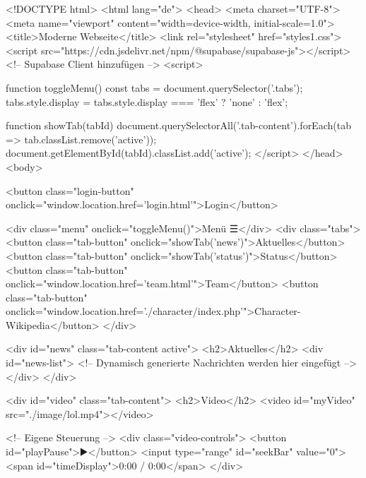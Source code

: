 <!DOCTYPE html>
<html lang="de">
<head>
    <meta charset="UTF-8">
    <meta name="viewport" content="width=device-width, initial-scale=1.0">
    <title>Moderne Webseite</title>
    <link rel="stylesheet" href="styles1.css">
    <script src="https://cdn.jsdelivr.net/npm/@supabase/supabase-js"></script> <!-- Supabase Client hinzufügen -->
    <script>


        function toggleMenu() {
            const tabs = document.querySelector('.tabs');
            tabs.style.display = tabs.style.display === 'flex' ? 'none' : 'flex';
        }

        function showTab(tabId) {
            document.querySelectorAll('.tab-content').forEach(tab => tab.classList.remove('active'));
            document.getElementById(tabId).classList.add('active');
        }
    </script>
</head>
<body>

    <button class="login-button" onclick="window.location.href='login.html'">Login</button>

    <div class="menu" onclick="toggleMenu()">Menü ☰</div>
    <div class="tabs">
        <button class="tab-button" onclick="showTab('news')">Aktuelles</button>
        <button class="tab-button" onclick="showTab('status')">Status</button>
        <button class="tab-button" onclick="window.location.href='team.html'">Team</button>
        <button class="tab-button" onclick="window.location.href='./character/index.php'">Character-Wikipedia</button>
    </div>

    <div id="news" class="tab-content active">
        <h2>Aktuelles</h2>
        <div id="news-list">
            <!-- Dynamisch generierte Nachrichten werden hier eingefügt -->
        </div>
    </div>

    <div id="video" class="tab-content">
        <h2>Video</h2>
        <video id="myVideo" src="./image/lol.mp4"></video>
        
        <!-- Eigene Steuerung -->
        <div class="video-controls">
            <button id="playPause">▶️</button>
            <input type="range" id="seekBar" value="0">
            <span id="timeDisplay">0:00 / 0:00</span>
        </div>

